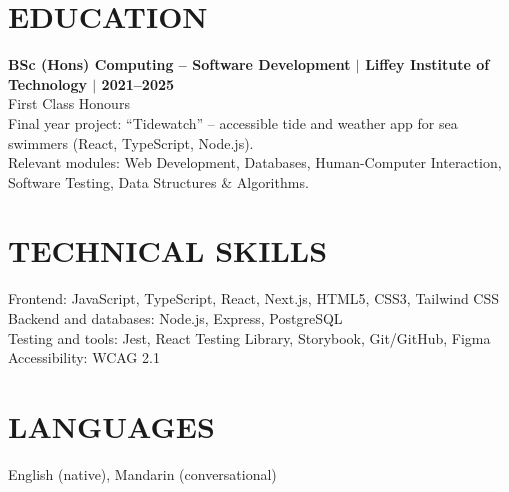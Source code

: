 \documentclass[11pt,a4paper]{article}
\begin{document}
\section*{EDUCATION}
\textbf{BSc (Hons) Computing -- Software Development $\mid$ Liffey Institute of Technology $\mid$ 2021--2025}\\
First Class Honours\\
Final year project: “Tidewatch” -- accessible tide and weather app for sea swimmers (React, TypeScript, Node.js).\\
Relevant modules: Web Development, Databases, Human-Computer Interaction, Software Testing, Data Structures \& Algorithms.

\section*{TECHNICAL SKILLS}
Frontend: JavaScript, TypeScript, React, Next.js, HTML5, CSS3, Tailwind CSS\\
Backend and databases: Node.js, Express, PostgreSQL\\
Testing and tools: Jest, React Testing Library, Storybook, Git/GitHub, Figma\\
Accessibility: WCAG 2.1

\section*{LANGUAGES}
English (native), Mandarin (conversational)
\end{document}
